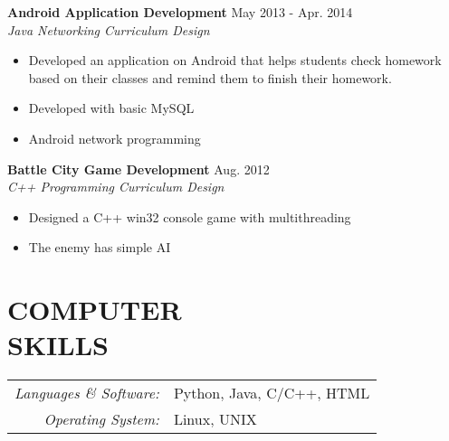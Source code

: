 \documentclass[margin,10pt]{res} %
\begin{document}
\begin{resume}
{\bf Android Application Development} \hfill May 2013 - Apr. 2014 \\
\textit{Java Networking Curriculum Design}
\begin{itemize}
\item Developed an application on Android that helps students check homework based on their classes and remind them to finish their homework.
\item Developed with basic MySQL
\item Android network programming
\end{itemize}

{\bf Battle City Game Development} \hfill Aug. 2012 \\
\textit{C++ Programming Curriculum Design}
\begin{itemize}  %
\item Designed a C++ win32 console game with multithreading
\item The enemy has simple AI
\end{itemize}



\section{COMPUTER \\ SKILLS}
\begin{tabular}{rl}
{\sl Languages \& Software:}
& Python, Java, C/C++, HTML \\
{\sl Operating System:}
& Linux, UNIX\\
\end{tabular}



\end{resume}
\end{document}
